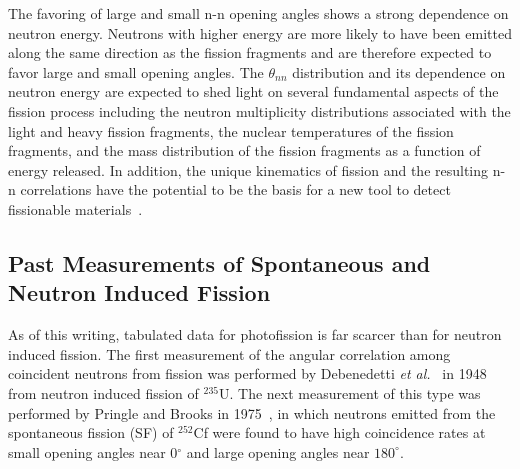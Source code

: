 \documentclass[%
 reprint,
 amsmath,amssymb,
 aps,
 nofootinbib
]{revtex4-1}
\begin{document}
The favoring of large and small n-n opening angles shows a strong dependence on neutron energy.
Neutrons with higher energy are more likely to have been emitted along the same direction as the fission fragments and are therefore expected to favor large and small opening angles.
The $\theta_{nn}$ distribution and its dependence on neutron energy are expected to shed light on several fundamental aspects of the fission process including the neutron multiplicity distributions associated with the light and heavy fission fragments, the nuclear temperatures of the fission fragments, and the mass distribution of the fission fragments as a function of energy released.
In addition, the unique kinematics of fission and the resulting n-n correlations have the potential to be the basis for a new tool to detect fissionable materials~\cite{Talou2018}.


\subsection{Past Measurements of Spontaneous and Neutron Induced Fission}
As of this writing, tabulated data for photofission is far scarcer than for neutron induced fission.
The first measurement of the angular correlation among coincident neutrons from fission was performed by Debenedetti \emph{et al.}~\cite{1948twoNCorr} in 1948 from neutron induced fission of $^{235}\text{U}$.
The next measurement of this type was performed by Pringle and Brooks in 1975~\cite{1975Cf252}, in which neutrons emitted from the spontaneous fission (SF) of $^{252}$Cf were found to have high coincidence rates at small opening angles near 0$^{\circ}$ and large opening angles near $180^{\circ}$.
\end{document}
